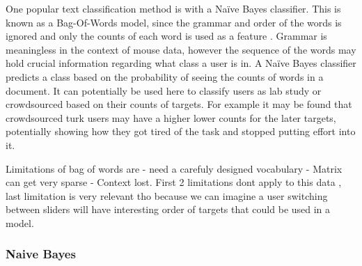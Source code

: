 \documentclass{article}
\begin{document}
One popular text classification method is with a Naïve Bayes classifier.
This is known as a Bag-Of-Words model, since the grammar and order of the words is ignored and only the counts of each word is used as a feature \cite{jurafsky2015text}.
Grammar is meaningless in the context of mouse data, however the sequence of the words may hold crucial information regarding what class a user is in.
A Naïve Bayes classifier predicts a class based on the probability of seeing the counts of words in a document.  
It can potentially be used here to classify users as lab study or crowdsourced based on their counts of targets.
For example it may be found that crowdsourced turk users may have a higher lower counts for the later targets, potentially showing how they got tired of the task and stopped putting effort into it.



Limitations of bag of words are - need a carefuly designed vocabulary 
- Matrix can get very sparse - Context lost.
First 2 limitations dont apply to this data
, last limitation is very relevant tho because we can imagine a user switching between sliders 
will have interesting order of targets that could be used in a model.



\subsubsection{Naive Bayes}
\end{document}
